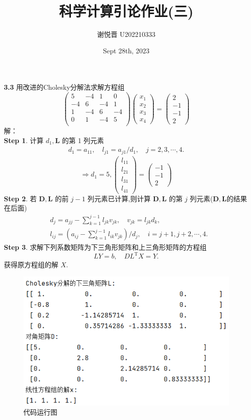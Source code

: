 \documentclass[a4paper,11pt,UTF8]{article}
\title{科学计算引论作业(三)}
\author{谢悦晋 \quad U202210333}
\date{Sept 28th, 2023 }
\begin{document}
\maketitle
\noindent\textbf{3.3} 用改进的Cholesky分解法求解方程组
$$
\begin{pmatrix}5&-4&1&0\\-4&6&-4&1\\1&-4&6&-4\\0&1&-4&5\\\end{pmatrix}\begin{pmatrix}x_1\\x_2\\x_3\\x_4\end{pmatrix}=\begin{pmatrix}2\\-1\\-1\\2\end{pmatrix}
$$
解：\\
\textbf{Step 1}. 计算 $d_1,\boldsymbol{L}$ 的第 1 列元素
$$
\begin{aligned}d_1=a_{11},\quad l_{j1}=a_{j1}/d_1,\quad j=2,3,\cdots,4.\end{aligned}
$$
$$\Rightarrow
d_1=5,\begin{pmatrix}l_{11}\\l_{21}\\l_{31}\\l_{41}\end{pmatrix}=\begin{pmatrix}-1\\-1\\2\end{pmatrix}
$$
\textbf{Step 2}. 若 $\boldsymbol{D,L}$ 的前 $j-1$ 列元素已计算,则计算 $\boldsymbol{D,L}$ 的第 $j$ 列元素($\boldsymbol{D,L}$的结果在后面)
$$
\begin{aligned}
	&d_j=a_{jj}-\sum_{k=1}^{j-1}l_{jk}v_{jk},\quad v_{jk}=l_{jk}d_k,\\
	&l_{ij}=\left(a_{ij}-\sum_{k=1}^{j-1}l_{ik}v_{jk}\right)/d_j,\quad i=j+1,j+2,\cdots,4.
\end{aligned}
$$
\noindent\textbf{Step 3}. 求解下列系数矩阵为下三角形矩阵和上三角形矩阵的方程组
$$
LY=b,\quad DL^\mathrm{T}X=Y.
$$
获得原方程组的解 $X$.
\begin{figure}[H] 
	\centering 
	\includegraphics[scale=0.8]{kx3.3_1.png}
	\caption{代码运行图}
\end{figure}
\end{document}
